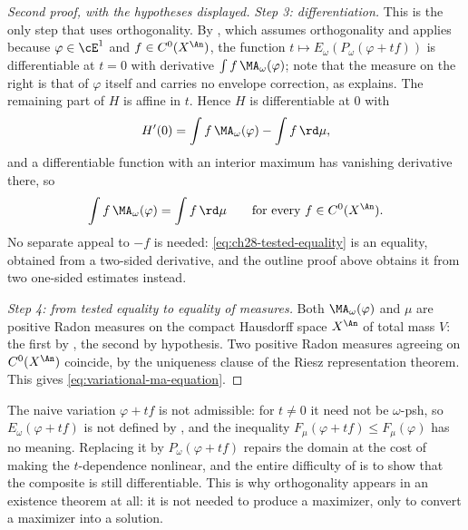 \begin{proof}[Second proof, with the hypotheses displayed]
\emph{Step 3: differentiation.}  This is the only step that uses
orthogonality.  By , which assumes
orthogonality and applies because $\varphi\in\cE^1$ and
$f\in C^0(X^{\An})$, the function
$t\mapsto E_\omega(P_\omega(\varphi+tf))$ is differentiable at $t=0$
with derivative $\int f\,\MA_\omega(\varphi)$; note that the measure on the
right is that of $\varphi$ itself and carries no envelope correction, as
 explains.  The remaining part of $H$
is affine in $t$.  Hence $H$ is differentiable at $0$ with
\[
 H'(0)=\int f\,\MA_\omega(\varphi)-\int f\,\rd\mu ,
\]
and a differentiable function with an interior maximum has vanishing
derivative there, so
\begin{equation}
\label{eq:ch28-tested-equality}
 \int f\,\MA_\omega(\varphi)=\int f\,\rd\mu
 \qquad\text{for every }f\in C^0(X^{\An}).
\end{equation}
No separate appeal to $-f$ is needed: \eqref{eq:ch28-tested-equality} is
an equality, obtained from a two-sided derivative, and the outline proof
above obtains it from two one-sided estimates instead.

\emph{Step 4: from tested equality to equality of measures.}  Both
$\MA_\omega(\varphi)$ and $\mu$ are positive Radon measures on the
compact Hausdorff space $X^{\An}$ of total mass $V$: the first by
, the second by hypothesis.  Two positive
Radon measures agreeing on $C^0(X^{\An})$ coincide, by the uniqueness
clause  of the Riesz representation theorem.
This gives \eqref{eq:variational-ma-equation}.
\end{proof}

\begin{remark}
\label{rem:ch28-envelope-essential}
The naive variation $\varphi+tf$ is not admissible: for $t\neq0$ it need
not be $\omega$-psh, so $E_\omega(\varphi+tf)$ is not defined by
, and the inequality $F_\mu(\varphi+tf)\leq
F_\mu(\varphi)$ has no meaning.  Replacing it by $P_\omega(\varphi+tf)$
repairs the domain at the cost of making the $t$-dependence nonlinear, and
the entire difficulty of  is to show that
the composite is still differentiable.  This is why orthogonality appears in
an existence theorem at all: it is not needed to produce a maximizer, only
to convert a maximizer into a solution.
\end{remark}

